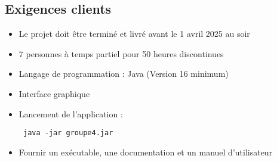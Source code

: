 \subsection{Exigences clients}
\begin{itemize}
    \item Le projet doit être terminé et livré avant le 1 avril 2025 au soir
    \item 7 personnes à temps partiel pour 50 heures discontinues
    \item Langage de programmation : Java (Version 16 minimum)
    \item Interface graphique
    \item {Lancement de l'application : \begin{verbatim} java -jar groupe4.jar    \end{verbatim}}
    \item Fournir un exécutable, une documentation et un manuel d'utilisateur
\end{itemize}